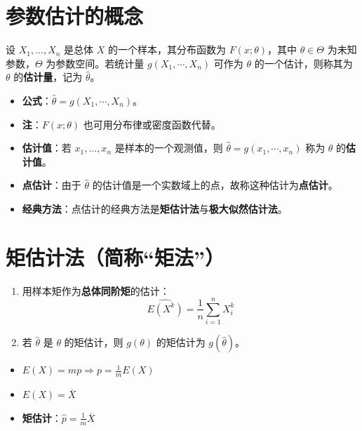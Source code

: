 \section{参数估计的概念}
\begin{definition}[估计量与点估计]
设 $X_{1}, \ldots, X_{n}$ 是总体 $X$ 的一个样本，其分布函数为 $F(x;\theta)$，其中 $\theta \in \Theta$ 为未知参数，$\Theta$ 为参数空间。若统计量 $g(X_{1}, \cdots, X_{n})$ 可作为 $\theta$ 的一个估计，则称其为 $\theta$ 的\textbf{估计量}，记为 $\hat{\theta}$。
\begin{itemize}
	\item \textbf{公式}：$\hat{\theta}=g(X_{1}, \cdots, X_{n})$。
	\item \textbf{注}：$F(x;\theta)$ 也可用分布律或密度函数代替。
	\item \textbf{估计值}：若 $x_{1}, \ldots, x_{n}$ 是样本的一个观测值，则 $\hat{\theta}=g(x_{1}, \cdots, x_{n})$ 称为 $\theta$ 的\textbf{估计值}。
	\item \textbf{点估计}：由于 $\hat{\theta}$ 的估计值是一个实数域上的点，故称这种估计为\textbf{点估计}。
	\item \textbf{经典方法}：点估计的经典方法是\textbf{矩估计法}与\textbf{极大似然估计法}。
\end{itemize}
\end{definition}

\section{矩估计法（简称“矩法”）}
\begin{theorem}[矩估计法]
\begin{enumerate}
	\item 用样本矩作为\textbf{总体同阶矩}的估计：
	\begin{equation}
		\hat{E(X^{k})} = \frac{1}{n}\sum_{i=1}^{n}X_{i}^{k}
		\label{eq:矩法:样本矩}
	\end{equation}
	\item 若 $\hat{\theta}$ 是 $\theta$ 的矩估计，则 $g(\theta)$ 的矩估计为 $g(\hat{\theta})$。
\end{enumerate}
\end{theorem}

\begin{example}
\begin{itemize}
	\item $E(X)=mp \Rightarrow p=\frac{1}{m}E(X)$
	\item $\hat{E(X)}=\overline{X}$
	\item \textbf{矩估计}：$\hat{p}=\frac{1}{m}\overline{X}$
\end{itemize}
\end{example}

